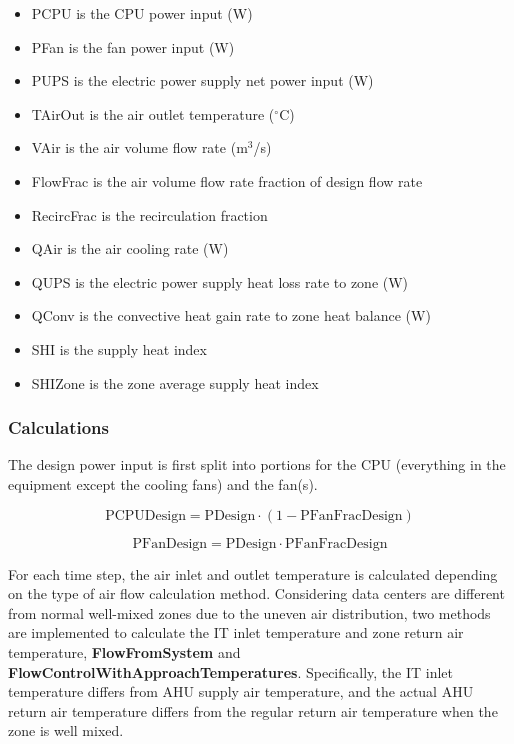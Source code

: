 \begin{itemize}
\tightlist
\item
  PCPU is the CPU power input (W)
\item
  PFan is the fan power input (W)
\item
  PUPS is the electric power supply net power input (W)
\item
  TAirOut is the air outlet temperature ($^\circ$C)
\item
  VAir is the air volume flow rate (m$^3$/s)
\item
  FlowFrac is the air volume flow rate fraction of design flow rate
\item
  RecircFrac is the recirculation fraction
\item
  QAir is the air cooling rate (W)
\item
  QUPS is the electric power supply heat loss rate to zone (W)
\item
  QConv is the convective heat gain rate to zone heat balance (W)
\item
  SHI is the supply heat index
\item
  SHIZone is the zone average supply heat index
\end{itemize}

\subsubsection{Calculations}\label{calculations}

The design power input is first split into portions for the CPU (everything in the equipment except the cooling fans) and the fan(s).

\begin{equation}
\textrm{PCPUDesign} = \textrm{PDesign} \cdot (1 - \textrm{PFanFracDesign})
\end{equation}

\begin{equation}
\textrm{PFanDesign} = \textrm{PDesign} \cdot \textrm{PFanFracDesign}
\end{equation}

For each time step,  the air inlet and outlet temperature is calculated depending on the type of air flow calculation method. Considering data centers are different from normal well-mixed zones due to the uneven air distribution, two methods are implemented to calculate the IT inlet temperature and zone return air temperature, \textbf{FlowFromSystem} and \textbf{FlowControlWithApproachTemperatures}. Specifically, the IT inlet temperature differs from AHU supply air temperature, and the actual AHU return air temperature differs from the regular return air temperature when the zone is well mixed.


